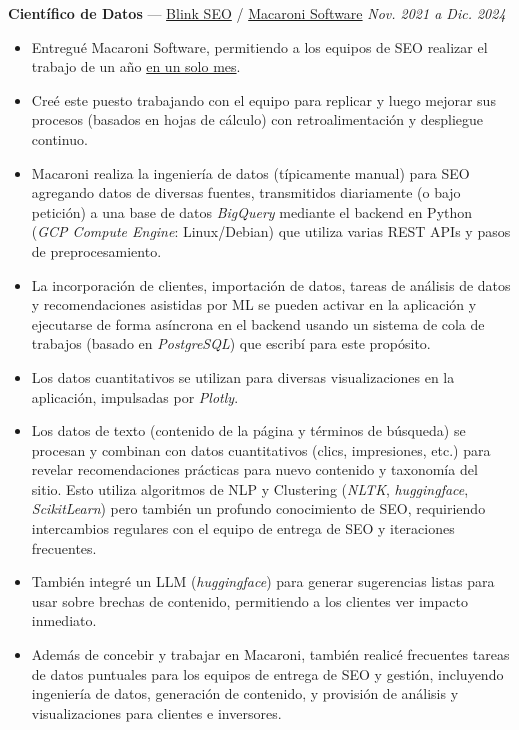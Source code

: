 \documentclass[10pt]{article}
\newenvironment{innerlist}[1][\enskip\textbullet]{
	\begin{itemize}[#1,leftmargin=*,parsep=0pt,itemsep=1pt,topsep=2pt,partopsep=0pt]
}{\end{itemize}}
\begin{document}
\textbf{Científico de Datos} — \href{https://www.blinkseo.co.uk}{Blink SEO} / \href{https://www.macaroni.works}{Macaroni Software} \hfill \emph{Nov. 2021 a Dic. 2024} \\
\vspace{-6pt}
\begin{innerlist}
\item Entregué Macaroni Software, permitiendo a los equipos de SEO realizar
	el trabajo de un año \href{https://www.linkedin.com/posts/sam-wright-17b6ab6_shopify-seo-activity-7170336529146441729-JGDn?utm_source=combined_share_message&utm_medium=member_desktop}{en un solo mes}.
\item Creé este puesto trabajando con el equipo para replicar
	y luego mejorar sus procesos (basados en hojas de cálculo) con retroalimentación y despliegue continuo.
\item Macaroni realiza la ingeniería de datos (típicamente manual) para SEO agregando datos de diversas fuentes,
	transmitidos diariamente (o bajo petición) a una base de datos \emph{BigQuery} mediante el backend en Python (\textit{GCP Compute Engine}: Linux/Debian) que utiliza
	varias REST APIs y pasos de preprocesamiento.
\item La incorporación de clientes, importación de datos, tareas de análisis de datos y recomendaciones asistidas por ML se pueden activar
	en la aplicación y ejecutarse de forma asíncrona en el backend usando un sistema de cola de trabajos (basado en \textit{PostgreSQL}) que escribí para este propósito.
\item Los datos cuantitativos se utilizan para diversas visualizaciones en la aplicación, impulsadas por \textit{Plotly}.
\item Los datos de texto (contenido de la página y términos de búsqueda) se procesan y combinan con
	datos cuantitativos (clics, impresiones, etc.) para revelar recomendaciones prácticas
	para nuevo contenido y taxonomía del sitio. Esto utiliza algoritmos de NLP y Clustering (\textit{NLTK}, \textit{huggingface}, \textit{ScikitLearn}) pero también
	un profundo conocimiento de SEO, requiriendo intercambios regulares con el equipo de entrega de SEO
	y iteraciones frecuentes.
\item También integré un LLM (\textit{huggingface}) para generar sugerencias listas para usar
	sobre brechas de contenido, permitiendo a los clientes ver impacto inmediato.
\item Además de concebir y trabajar en Macaroni, también realicé frecuentes
	tareas de datos puntuales para los equipos de entrega de SEO y gestión, incluyendo
	ingeniería de datos, generación de contenido, y provisión de análisis y
	visualizaciones para clientes e inversores.
\end{innerlist}
\end{document}
